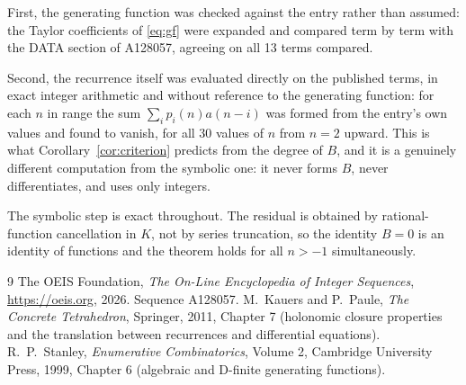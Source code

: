 \documentclass[11pt,a4paper]{article}
\theoremstyle{plain}
\theoremstyle{definition}
\begin{document}
First, the generating function was checked against the entry rather than assumed: the
Taylor coefficients of \eqref{eq:gf} were expanded and compared term by term with the DATA
section of A128057, agreeing on all 13 terms compared.

Second, the recurrence itself was evaluated directly on the published terms, in exact
integer arithmetic and without reference to the generating function: for each $n$ in range
the sum $\sum_{i}p_{i}(n)a(n-i)$ was formed from the entry's own values and found to
vanish, for all 30 values of $n$ from $n=2$ upward. This is what
Corollary~\ref{cor:criterion} predicts from the degree of $B$, and it is a genuinely
different computation from the symbolic one: it never forms $B$, never differentiates, and
uses only integers.

The symbolic step is exact throughout. The residual is obtained by rational-function
cancellation in $K$, not by series truncation, so the identity $B=0$ is an
identity of functions and the theorem holds for all $n>-1$ simultaneously.

\begin{thebibliography}{9}
 The OEIS Foundation, \emph{The On-Line Encyclopedia of Integer Sequences},
\url{https://oeis.org}, 2026. Sequence A128057.
 M.~Kauers and P.~Paule, \emph{The Concrete Tetrahedron}, Springer, 2011,
Chapter 7 (holonomic closure properties and the translation between recurrences and
differential equations).
 R.~P.~Stanley, \emph{Enumerative Combinatorics}, Volume 2, Cambridge
University Press, 1999, Chapter 6 (algebraic and D-finite generating functions).
\end{thebibliography}
\end{document}
